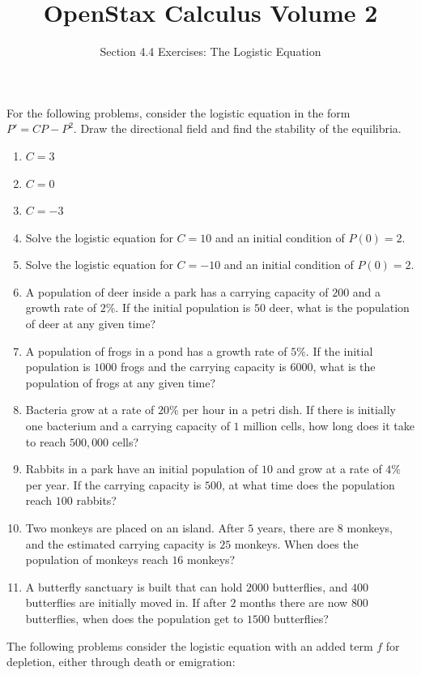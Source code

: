 \documentclass{exercises}
\title{OpenStax Calculus Volume 2}
\subtitle{Section 4.4 Exercises: The Logistic Equation}
\author{}
\date{}
\begin{document}
\maketitle


For the following problems, consider the logistic equation in the form $P'=CP-P^{2}$. Draw the directional field and find the stability of the equilibria.

\begin{enumerate}[start=1]
\item $C=3$
\item $C=0$
\item $C=-3$
\item Solve the logistic equation for $C=10$ and an initial condition of $P(0)=2$.
\item Solve the logistic equation for $C=-10$ and an initial condition of $P(0)=2$.
\item A population of deer inside a park has a carrying capacity of $200$ and a growth rate of $2\%$. If the initial population is $50$ deer, what is the population of deer at any given time?
\item A population of frogs in a pond has a growth rate of $5\%$. If the initial population is $1000$ frogs and the carrying capacity is $6000$, what is the population of frogs at any given time?
\item \techrequired Bacteria grow at a rate of $20\%$ per hour in a petri dish. If there is initially one bacterium and a carrying capacity of $1$ million cells, how long does it take to reach $500{,}000$ cells?
\item \techrequired Rabbits in a park have an initial population of $10$ and grow at a rate of $4\%$ per year. If the carrying capacity is $500$, at what time does the population reach $100$ rabbits?
\item \techrequired Two monkeys are placed on an island. After $5$ years, there are $8$ monkeys, and the estimated carrying capacity is $25$ monkeys. When does the population of monkeys reach $16$ monkeys?
\item \techrequired A butterfly sanctuary is built that can hold $2000$ butterflies, and $400$ butterflies are initially moved in. If after $2$ months there are now $800$ butterflies, when does the population get to $1500$ butterflies?
\end{enumerate}

The following problems consider the logistic equation with an added term $f$ for depletion, either through death or emigration:
\end{document}
